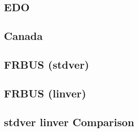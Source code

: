 \documentclass[12pt]{article}
\begin{document}
\subsection{EDO}
\label{sec:edo}

\subsection{Canada}
\label{sec:canada}


\subsection{FRBUS (stdver)}
\label{sec:frbus-stdver}

\subsection{FRBUS (linver)}
\label{sec:frbus-linver}

\subsection{stdver  linver Comparison}
\label{sec:comparison-linver}
\end{document}
